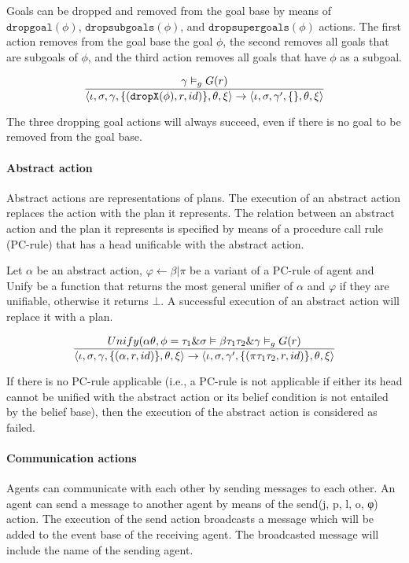 \documentclass[a4paper]{article}
\begin{document}
Goals can be dropped and removed from the goal base by means of $\texttt{dropgoal}(\phi)$, $\texttt{dropsubgoals}(\phi)$, and $\texttt{dropsupergoals}(\phi)$ actions. The ﬁrst action removes from the goal base the goal $\phi$, the second removes all goals that are subgoals of $\phi$, and the third action removes all goals that have $\phi$ as a subgoal.

$$ {{\gamma \vDash_{g} G(r)} \over {\langle \iota, \sigma, \gamma, \{(\texttt{dropX}(\phi), r, id)\}, \theta, \xi \rangle  \rightarrow \langle \iota, \sigma, \gamma', \{\}, \theta, \xi \rangle}} $$

The three dropping goal actions will always succeed, even if there is no goal to be removed from the goal base.

\paragraph{Abstract action}

Abstract actions are representations of plans. The execution of an abstract action replaces the action with the plan it represents. The relation between an abstract action and the plan it represents is speciﬁed by means of a procedure call rule (PC-rule) that has a head uniﬁcable with the abstract action.

Let $\alpha$ be an abstract action, $\varphi \leftarrow \beta \vert \pi$ be a variant of a PC-rule of agent and Unify be a function that returns the most general uniﬁer of $\alpha$ and $\varphi$ if they are uniﬁable, otherwise it returns $\bot$. A successful execution of an abstract action will replace it with a plan.

$$ {{Unify(\alpha\theta, \phi = \tau_{1} \& \sigma \vDash \beta\tau_{1}\tau_{2} \& \gamma \vDash_{g} G(r) } \over {\langle \iota, \sigma, \gamma, \{(\alpha, r, id)\}, \theta, \xi \rangle  \rightarrow \langle \iota, \sigma, \gamma', \{(\pi\tau_{1}\tau_{2}, r, id)\}, \theta, \xi \rangle}} $$

If there is no PC-rule applicable (i.e., a PC-rule is not applicable if either its head cannot be uniﬁed with the abstract action or its belief condition is not entailed by the belief base), then the execution of the abstract action is considered as failed.

\paragraph{Communication actions}

Agents can communicate with each other by sending messages to each other. An agent can send a message to another agent by means of the send(j, p, l, o, φ) action. The execution of the send action broadcasts a message which will be added to the event base of the receiving agent. The broadcasted message will include the name of the sending agent.
\end{document}
